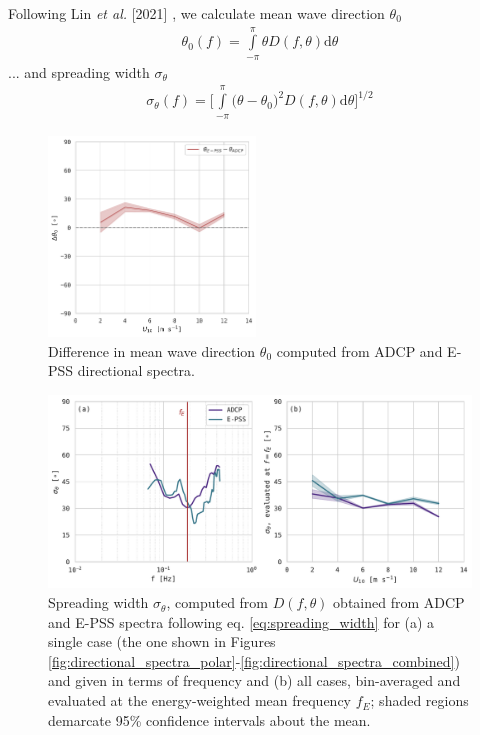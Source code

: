 \documentclass[letterpaper,journal]{IEEEtran}
\begin{document}
\newpage

Following Lin \emph{et al.} [2021] \cite{lin_estimating_2022}, we calculate mean wave direction $\theta_0$
\begin{align}
    \theta_0(f)=\int\limits_{-\pi}^{\pi}\theta D(f,\theta)\mathrm{d}\theta
    \label{eq:mean_wave_direction}
\end{align}
... and spreading width $\sigma_\theta$
\begin{align}
    \sigma_\theta(f)=\Bigg[\int\limits_{-\pi}^{\pi}\big(\theta-\theta_0\big)^2 D(f,\theta)\mathrm{d}\theta\Bigg]^{1/2}
\label{eq:spreading_width}
\end{align}

\vspace{-20pt}

\begin{figure}[!ht]
    \centering
    \includegraphics[width=0.49\textwidth]{_figures/delta_theta_nought.pdf}
    \caption{Difference in mean wave direction $\theta_0$ computed from ADCP and E-PSS directional spectra.}
    \label{fig:delta_theta_nought}
\end{figure}

\begin{figure}[!hb]
    \centering
    \includegraphics[width=\textwidth]{_figures/directional_spreading_comparison.pdf}
    \vspace{-20pt}
\caption{Spreading width $\sigma_\theta$, computed from $D(f,\theta)$ obtained from ADCP and E-PSS spectra following eq. \ref{eq:spreading_width} for (a) a single case (the one shown in Figures \ref{fig:directional_spectra_polar}-\ref{fig:directional_spectra_combined}) and given in terms of frequency and (b) all cases, bin-averaged and evaluated at the energy-weighted mean frequency $f_E$; shaded regions demarcate 95\% confidence intervals about the mean.}
\label{fig:directional_spreading_comparison}
\end{figure}
\end{document}
